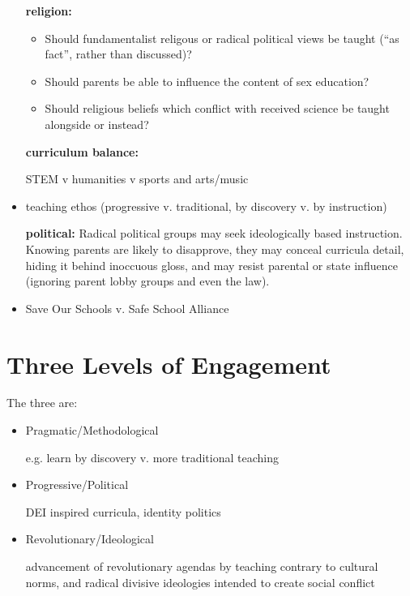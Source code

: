 \documentclass[10pt,titlepage]{article}
\begin{document}
\begin{itemize}

\item[\bf religion:]

  \begin{itemize}
    
  \item Should fundamentalist religous or radical political views be taught (``as fact'', rather than discussed)?
  \item Should parents be able to influence the content of sex education?
    \item Should religious beliefs which conflict with received science be taught alongside or instead?
  \end{itemize}
  
\item[\bf curriculum balance:]

  STEM v humanities v sports and arts/music

  \item teaching ethos (progressive v. traditional, by discovery v. by instruction)

  \item[\bf political:]
    Radical political groups may seek ideologically based instruction.
    Knowing parents are likely to disapprove, they may conceal curricula detail, hiding it behind inoccuous gloss, and may resist parental or state influence (ignoring parent lobby groups and even the law).

    \item Save Our Schools v. Safe School Alliance
    
\end{itemize}

\section{Three Levels of Engagement}

The three are:

\begin{itemize}
\item Pragmatic/Methodological

  e.g. learn by discovery v. more traditional teaching

\item Progressive/Political

DEI inspired curricula, identity politics
  
\item Revolutionary/Ideological

  advancement of revolutionary agendas by teaching contrary to cultural norms, and radical divisive ideologies intended to create social conflict
\end{itemize}
\end{document}

